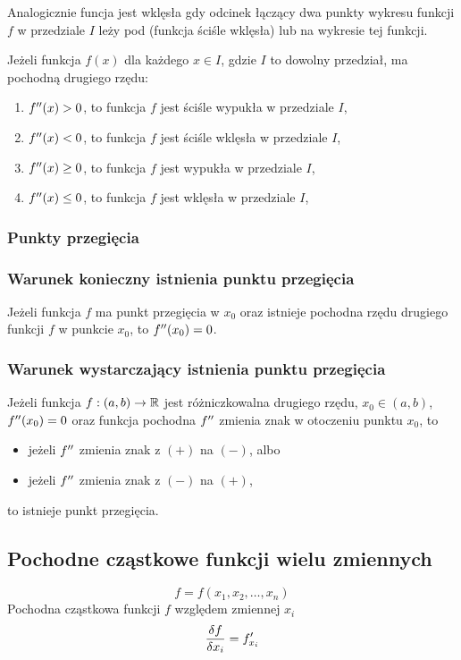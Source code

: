 \documentclass[../Matematyka.tex]{subfiles}
\begin{document}
    Analogicznie funcja jest wklęsła gdy odcinek łączący dwa punkty wykresu funkcji \(f\) w przedziale \(I\) leży pod (funkcja ściśle wklęsła) lub na wykresie tej funkcji.

    Jeżeli funkcja \(f(x)\) dla każdego \(x \in I\), gdzie \(I\) to dowolny przedział, ma pochodną drugiego rzędu:
    \begin{enumerate}
        \item \(f^{\prime\prime}(x) > 0\), to funkcja \(f\) jest ściśle wypukła w przedziale \(I\),
        \item \(f^{\prime\prime}(x) < 0\), to funkcja \(f\) jest ściśle wklęsła w przedziale \(I\),
        \item \(f^{\prime\prime}(x) \geq 0\), to funkcja \(f\) jest wypukła w przedziale \(I\),
        \item \(f^{\prime\prime}(x) \leq 0\), to funkcja \(f\) jest wklęsła w przedziale \(I\),
    \end{enumerate}

    \subsubsection{Punkty przegięcia}
    \subsubsection*{Warunek konieczny istnienia punktu przegięcia}
    Jeżeli funkcja \(f\) ma punkt przegięcia w \(x_0\) oraz istnieje pochodna rzędu drugiego funkcji \(f\) w punkcie \(x_0\), to \(f^{\prime\prime}(x_0) = 0\).
    \subsubsection*{Warunek wystarczający istnienia punktu przegięcia}
    Jeżeli funkcja \(f:(a, b) \rightarrow \mathbb{R}\) jest różniczkowalna drugiego rzędu, \(x_0 \in (a,b)\), \(f^{\prime\prime}(x_0) = 0\) oraz funkcja pochodna \(f^{\prime\prime}\) zmienia znak w otoczeniu punktu \(x_0\), to
    \begin{itemize}
        \item jeżeli \(f^{\prime\prime}\) zmienia znak z \((+)\) na \((-)\), albo
        \item jeżeli \(f^{\prime\prime}\) zmienia znak z \((-)\) na \((+)\),
    \end{itemize}
    to istnieje punkt przegięcia.

    \subsection{Pochodne cząstkowe funkcji wielu zmiennych}
    \[f = f(x_1, x_2, \dots, x_n)\]
    Pochodna cząstkowa funkcji \(f\) względem zmiennej \(x_i\)
    \[\frac{\delta f}{\delta x_i} = f^\prime_{x_i}\]
\end{document}
